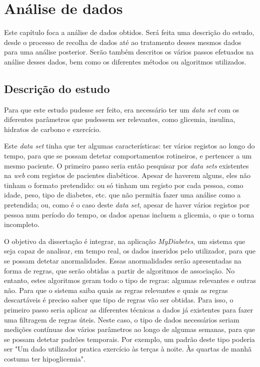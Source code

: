 \chapter{Análise de dados}\label{chap:dese}

Este capítulo foca a análise de dados obtidos. Será feita uma descrição do estudo, desde o processo de recolha de dados até ao tratamento desses mesmos dados para uma análise posterior. Serão também descritos os vários passos efetuados na análise desses dados, bem como os diferentes métodos ou algoritmos utilizados.

\section{Descrição do estudo}


Para que este estudo pudesse ser feito, era necessário ter um \textit{data set} com os diferentes parâmetros que pudessem ser relevantes, como glicemia, insulina, hidratos de carbono e exercício. 


Este \textit{data set} tinha que ter algumas características: ter vários registos ao longo do tempo, para que se possam detetar comportamentos rotineiros, e pertencer a um mesmo paciente. O primeiro passo seria então pesquisar por \textit{data sets} existentes na \textit{web} com registos de pacientes diabéticos. Apesar de haverem alguns, eles não tinham o formato pretendido: ou só tinham um registo por cada pessoa, como idade, peso, tipo de diabetes, etc. que não permitia fazer uma análise como a pretendida; ou, como é o caso deste \textit{data set}, apesar de haver vários registos por pessoa num período do tempo, os dados apenas incluem a glicemia, o que o torna incompleto.


O objetivo da dissertação é integrar, na aplicação \textit{MyDiabetes}, um sistema que seja capaz de analisar, em tempo real, os dados inseridos pelo utilizador, para que se possam detetar anormalidades. Essas anormalidades serão apresentadas na forma de regras, que serão obtidas a partir de algoritmos de associação. No entanto, estes algoritmos geram todo o tipo de regras: algumas relevantes e outras não. Para que o sistema saiba quais as regras relevantes e quais as regras descartáveis é preciso saber que tipo de regras vão ser obtidas. Para isso, o primeiro passo seria aplicar as diferentes técnicas a dados já existentes para fazer uma filtragem de regras úteis. Neste caso, o tipo de dados necessários seriam medições contínuas dos vários parâmetros ao longo de algumas semanas, para que se possam detetar padrões temporais. Por exemplo, um padrão deste tipo poderia ser "Um dado utilizador pratica exercício às terças à noite. Às quartas de manhã costuma ter hipoglicemia". 

